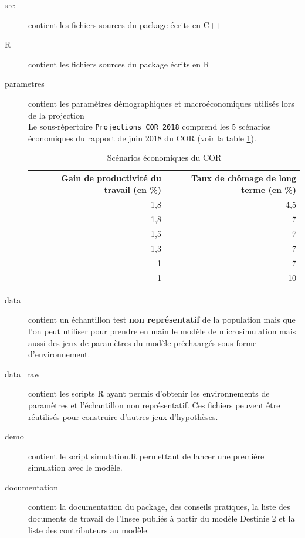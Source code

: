 	\begin{description}
		\item[src] contient les fichiers sources du package écrits en C++
		\item[R] contient les fichiers sources du package écrits en R
		\item[parametres] contient les paramètres démographiques et macroéconomiques utilisés lors de la projection\\
Le sous-répertoire {\tt Projections\_COR\_2018} comprend les 5 scénarios économiques du rapport de juin 2018 du COR (voir la table \ref{tab:hypscCOR}). 
\renewcommand{\arraystretch}{1.8}

\begin{table}[h]
  \centering
  \caption{Scénarios économiques du COR}
    \begin{tabular}{rr}
    \toprule
 Gain de productivité du travail (en \%) & Taux de chômage de long terme (en \%) \\
    \midrule
 1,8     & 4,5 \\
 1,8   & 7 \\
 1,5   & 7 \\
 1,3   & 7 \\
 1     & 7 \\
 1     & 10 \\
    \bottomrule
    \end{tabular}%
  \label{tab:hypscCOR}%
\end{table}%
		\item[data] contient un échantillon test \textbf{non représentatif} de la population mais que l'on peut utiliser pour prendre en main le modèle de microsimulation mais aussi des jeux de paramètres du modèle préchaargés sous forme d'environnement.
		\item[data_raw] contient les scripts R ayant permis d'obtenir les environnements de paramètres et l'échantillon non représentatif. Ces fichiers peuvent être réutilisés pour construire d'autres jeux d'hypothèses.
		\item[demo] contient le script simulation.R permettant de lancer une première simulation avec le modèle.
		\item[documentation] contient la documentation du package, des conseils pratiques, la liste des documents de travail de l'Insee publiés à partir du modèle Destinie 2 et la liste des contributeurs au modèle.
	\end{description}






